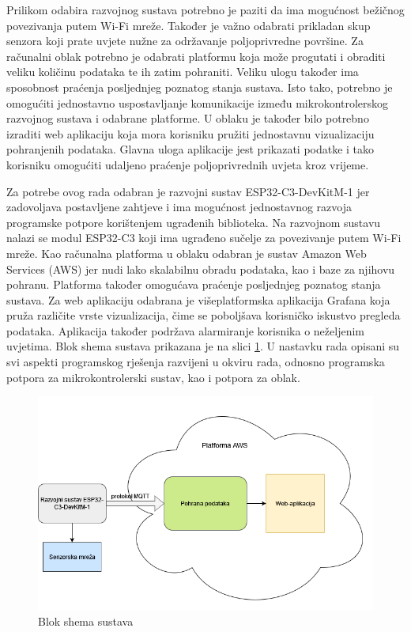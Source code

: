 Prilikom odabira razvojnog sustava potrebno je paziti da ima mogućnost bežičnog povezivanja putem Wi-Fi mreže. Također je važno odabrati prikladan skup senzora koji prate uvjete nužne za održavanje poljoprivredne površine. Za računalni oblak potrebno je odabrati platformu koja može progutati i obraditi veliku količinu podataka te ih zatim pohraniti. Veliku ulogu također ima sposobnost praćenja posljednjeg poznatog stanja sustava. Isto tako, potrebno je omogućiti jednostavno uspostavljanje komunikacije između mikrokontrolerskog razvojnog sustava i odabrane platforme. U oblaku je također bilo potrebno izraditi web aplikaciju koja mora korisniku pružiti jednostavnu vizualizaciju pohranjenih podataka. Glavna uloga aplikacije jest prikazati podatke i tako korisniku omogućiti udaljeno praćenje poljoprivrednih uvjeta kroz vrijeme. 

Za potrebe ovog rada odabran je razvojni sustav ESP32-C3-DevKitM-1 jer zadovoljava postavljene zahtjeve i ima mogućnost jednostavnog razvoja programske potpore korištenjem ugrađenih biblioteka. Na razvojnom sustavu nalazi se modul ESP32-C3 koji ima ugrađeno sučelje za povezivanje putem Wi-Fi mreže. Kao računalna platforma u oblaku odabran je sustav Amazon Web Services (AWS) jer nudi lako skalabilnu obradu podataka, kao i baze za njihovu pohranu. Platforma također omogućava praćenje posljednjeg poznatog stanja sustava. Za web aplikaciju odabrana je višeplatformska aplikacija Grafana koja pruža različite vrste vizualizacija, čime se poboljšava korisničko iskustvo pregleda podataka. Aplikacija također podržava alarmiranje korisnika o neželjenim uvjetima. Blok shema sustava prikazana je na slici \ref{fig:shema}. U nastavku rada opisani su svi aspekti programskog rješenja razvijeni u okviru rada, odnosno programska potpora za mikrokontrolerski sustav, kao i potpora za oblak.

\begin{figure}[ht]
	\includegraphics[width=\linewidth]{imgs/shema}
	\caption{Blok shema sustava}
	\label{fig:shema}
\end{figure}

\eject
